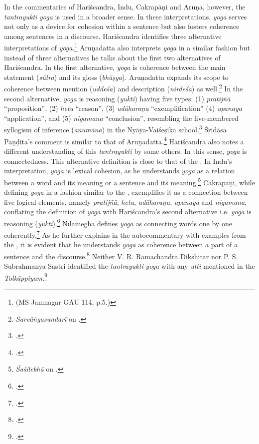 In the commentaries of Hariścandra, Indu, Cakrapāṇi and Aruṇa, however, the \emph{tantrayukti} \emph{yoga} is used in a broader sense. In these interpretations, \emph{yoga} serves not only as a device for cohesion within a sentence but also fosters coherence among sentences in a discourse. Hariścandra identifies three alternative interpretations of \emph{yoga}.\footnote{ (MS Jamnagar GAU 114, p.5.)} 
Aruṇadatta also interprets \emph{yoga} in a similar fashion but instead of three alternatives he talks about the first two alternatives of Hariścandra. In the first alternative, \emph{yoga} is coherence between the main statement (\emph{sūtra}) and its gloss (\emph{bhāṣya}).
Aruṇadatta expands its scope to coherence between mention (\emph{uddeśa}) and description (\emph{nirdeśa}) as well.\footnote{ \emph{Sarvāṅgasundarī} on .}  
In the second alternative, \emph{yoga} is reasoning (\emph{yukti}) having five types: (1) \emph{pratijñā} “proposition”, (2) \emph{hetu} “reason”, (3) \emph{udāharaṇa} “exemplification” (4) \emph{upanaya} “application”, and (5) \emph{nigamana} “conclusion”, resembling the five-membered syllogism of inference (\emph{anumāna}) in the Nyāya-Vaiśeṣika school.\footnote{
	 .}
Śrīdāsa Paṇḍita's comment is similar to that of Aruṇadatta.\footcite[2]{muss-1940}  
Hariścandra also notes a different understanding of this \emph{tantrayukti} by some others. In this sense, \emph{yoga} is connectedness. This alternative definition is close to that of the \SS. In Indu's interpretation, \emph{yoga} is lexical cohesion, as he understands \emph{yoga} as a relation between a word and its meaning or a sentence and its meaning.\footnote{ \emph{Śaśilekhā} on .} 
Cakrapāṇi, while defining \emph{yoga} in a fashion similar to the \SS, exemplifies it as a connection between five logical elements, namely \emph{pratijñā}, \emph{hetu}, \emph{udāharaṇa}, \emph{upanaya} and \emph{nigamana}, conflating the definition of \emph{yoga} with Hariścandra's second alternative i.e. \emph{yoga} is reasoning (\emph{yukti}).\footnote{ .} 
Nīlamegha defines \emph{yoga} as connecting words one by one coherently.\footnote{ \cite[2][3]{muth-1976}.} As he further explains in the autocommentary with examples from the \AHS, it is evident that he understands \emph{yoga} as coherence between a part of a sentence and the discourse.\footcite[3]{muth-1976} 
Neither V. R. Ramachandra Dikshitar nor P. S. Subrahmanya Sastri identified the \emph{tantrayukti} \emph{yoga} with any \emph{utti} mentioned in the \emph{Tolkāppiyam}.\footnote{\cite[84]{chev-2009}.} 

